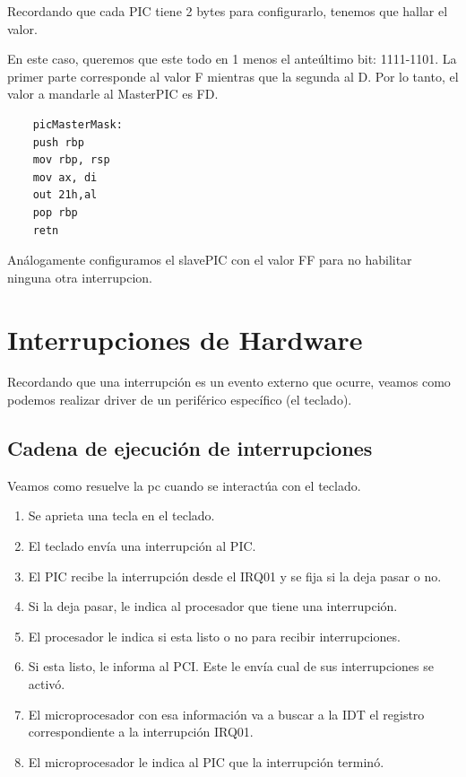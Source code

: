 \documentclass[]{article}
\begin{document}
Recordando que cada PIC tiene 2 bytes para configurarlo, tenemos que hallar el valor.

En este caso, queremos que este todo en 1 menos el ante\'ultimo bit: 1111-1101.
La primer parte corresponde al valor F mientras que la segunda al D. Por lo tanto,
el valor a mandarle al MasterPIC es FD.

\begin{lstlisting}
	picMasterMask:
	push rbp
	mov rbp, rsp
	mov ax, di
	out	21h,al
	pop rbp
	retn
\end{lstlisting}
An\'alogamente configuramos el slavePIC con el valor FF para no habilitar ninguna
otra interrupcion.

\section*{Interrupciones de Hardware}

Recordando que una interrupci\'on es un evento externo que ocurre, veamos como podemos
realizar driver de un perif\'erico espec\'ifico (el teclado).

\subsection*{Cadena de ejecuci\'on de interrupciones}
Veamos como resuelve la pc cuando se interact\'ua con el teclado.

\begin{center}
	\begin{enumerate}
		\item Se aprieta una tecla en el teclado.
		\item El teclado env\'ia una interrupci\'on al PIC.
		\item El PIC recibe la interrupci\'on desde el IRQ01 y se
		fija si la deja pasar o no.
		\item Si la deja pasar, le indica al procesador que tiene una interrupci\'on.
		\item El procesador le indica si esta listo o no para recibir interrupciones.
		\item Si esta listo, le informa al PCI. Este le env\'ia cual de sus interrupciones se activ\'o.
		\item El microprocesador con esa informaci\'on va a buscar a la IDT el registro correspondiente a la interrupci\'on IRQ01.
		\item El microprocesador le indica al PIC que la interrupci\'on termin\'o.
	\end{enumerate}
\end{center}
\end{document}
